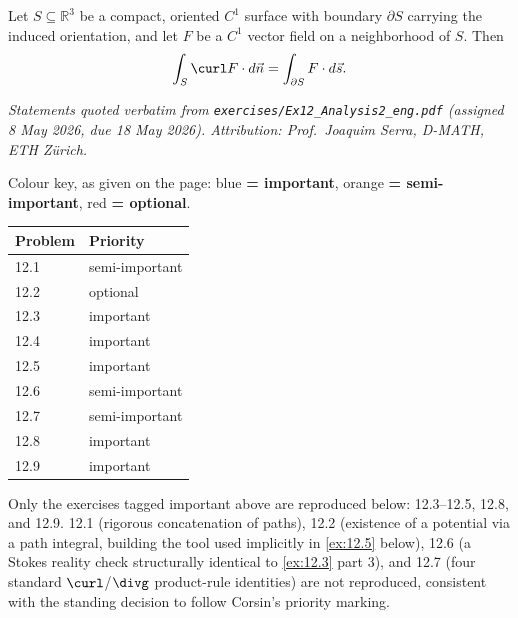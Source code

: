 \begin{theorem}
\label{thm:stokes_classical}
Let $S \subseteq \mathbb{R}^3$ be a compact, oriented $C^1$ surface with boundary $\partial S$
carrying the induced orientation, and let $F$ be a $C^1$ vector field on a neighborhood of
$S$. Then
\[\int_S \curl F \cdot d\vec{n} = \int_{\partial S} F \cdot d\vec{s}.\]
\end{theorem}


\textit{Statements quoted verbatim from \texttt{exercises/Ex12\_Analysis2\_eng.pdf} (assigned
8 May 2026, due 18 May 2026). Attribution: Prof.\ Joaquim Serra, D-MATH, ETH Z\"urich.}

\begin{ainote}
Colour key, as given on the page: blue \textbf{= important}, orange \textbf{= semi-important},
red \textbf{= optional}.

\begin{center}
\begin{tabular}{@{}l l@{}}
\textbf{Problem} & \textbf{Priority} \\
\hline
12.1 & semi-important \\
12.2 & optional \\
12.3 & important \\
12.4 & important \\
12.5 & important \\
12.6 & semi-important \\
12.7 & semi-important \\
12.8 & important \\
12.9 & important \\
\end{tabular}
\end{center}
\end{ainote}

\begin{ainote}
Only the exercises tagged important above are reproduced below: 12.3--12.5, 12.8, and 12.9.
12.1 (rigorous concatenation of paths), 12.2 (existence of a potential via a path integral,
building the tool used implicitly in \cref{ex:12.5} below), 12.6 (a Stokes reality check
structurally identical to \cref{ex:12.3} part 3), and 12.7 (four standard $\curl$/$\divg$
product-rule identities) are not reproduced, consistent with the standing decision to follow
Corsin's priority marking.
\end{ainote}

